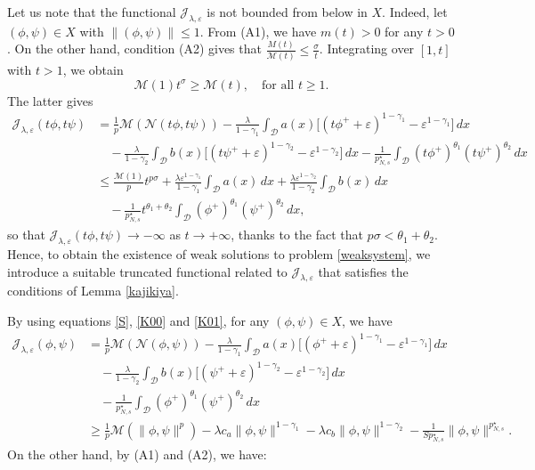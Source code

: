 \documentclass[10pt,a4paper]{amsart}
\numberwithin{equation}{section}
\begin{document}
Let us note that the functional $\mathcal{J}_{\lambda,\varepsilon}$ is not bounded 
from below in $X$. Indeed, let $(\phi,\psi)\in X$ with $\|(\phi,\psi)\|\leq 1$. 
From (A1), we have $m(t)>0$ for any $t>0$. On the other hand, condition (A2) gives 
that $\frac{M(t)}{\mathscr{M}(t)}\leq\frac{\sigma}{t}$. 
Integrating over $[1,t]$ with $t>1$, we obtain
\[
\mathscr{M}(1)t^\sigma\geq \mathscr{M}(t), \quad \text{for all } t\geq 1.
\]
The latter gives
\begin{align*}
\mathcal{J}_{\lambda,\varepsilon}(t\phi,t\psi)&=\frac{1}{p}\mathscr{M}(\mathcal{N}(t\phi,t\psi))-\frac{\lambda}{1-\gamma_1}\int_\mathcal{D} a(x)\Big[(t\phi^++\varepsilon)^{1-\gamma_1}-\varepsilon^{1-\gamma_1}\Big]\,dx\\
&\quad -\frac{\lambda}{1-\gamma_2}\int_\mathcal{D} b(x)\Big[(t\psi^+
 +\varepsilon)^{1-\gamma_2}-\varepsilon^{1-\gamma_2}\Big]\,dx
 -\frac{1}{p^\star_{N,s}}\int_\mathcal{D}  (t\phi^+)^{\theta_1}(t\psi^+)^{\theta_2}\,dx\\
&\leq \frac{\mathscr{M}(1)}{p}t^{p\sigma}
 +\frac{\lambda\varepsilon^{1-\gamma_1}}{1-\gamma_1}\int_\mathcal{D}a(x)\,dx
 +\frac{\lambda\varepsilon^{1-\gamma_2}}{1-\gamma_2} \int_\mathcal{D}b(x)\,dx\\
&\quad -\frac{1}{p^\star_{N,s}}t^{\theta_1+\theta_2}
 \int_\mathcal{D}  (\phi^+)^{\theta_1}(\psi^+)^{\theta_2}\,dx,
\end{align*}
so that $\mathcal{J}_{\lambda,\varepsilon}(t\phi,t\psi)\to -\infty$ as $t\to +\infty$, 
thanks to the fact that $p\sigma<\theta_1+\theta_2$. Hence, to obtain the existence 
of weak solutions to problem \eqref{weaksystem}, we introduce a suitable truncated 
functional related to $\mathcal{J}_{\lambda,\varepsilon}$ that satisfies the 
conditions of Lemma \ref{kajikiya}.

By using equations \eqref{S}, \eqref{K00} and \eqref{K01}, for any 
$(\phi,\psi)\in X$, we have
\begin{align*}
\mathcal{J}_{\lambda,\varepsilon}(\phi,\psi)
&= \frac{1}{p}\mathscr{M}(\mathcal{N}(\phi,\psi))
 -\frac{\lambda}{1-\gamma_1}\int_\mathcal{D} a(x)\Big[(\phi^+
 +\varepsilon)^{1-\gamma_1}-\varepsilon^{1-\gamma_1}\Big]\,dx\\
&\quad - \frac{\lambda}{1-\gamma_2}\int_\mathcal{D} b(x)
 \Big[(\psi^++\varepsilon)^{1-\gamma_2}-\varepsilon^{1-\gamma_2}\Big]\,dx\\
&\quad - \frac{1}{p^\star_{N,s}}\int_\mathcal{D}  (\phi^+)^{\theta_1}
 (\psi^+)^{\theta_2}\,dx\\
&\geq \frac{1}{p}\mathscr{M}(\|\phi,\psi\|^p)
 - \lambda c_a\| \phi,\psi\|^{1-\gamma_1}-\lambda c_b\| \phi,\psi\|^{1-\gamma_2}
 -\frac{1}{Sp^\star_{N,s}}\| \phi,\psi\|^{p^\star_{N,s}}.
\end{align*}
On the other hand, by (A1) and (A2), we have:
\end{document}
